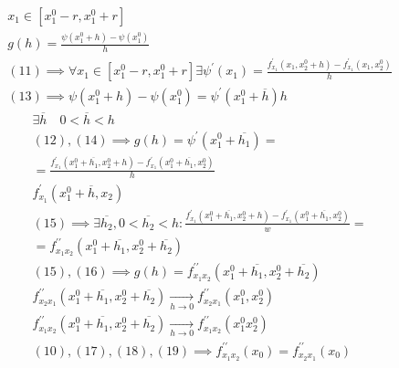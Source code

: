 \documentclass[main]{subfiles}
\begin{document}
\begin{longProof}
            \begin{gather*}
                x_1 \in [x_1^0-r,x_1^0+r] \\
                g(h) = \frac{\psi(x^0_1+h)-\psi(x_1^0)}{h} \tag{12}\\
                (11) \implies \forall x_1 \in [x_1^0-r,x_1^0+r] \exists \psi^\prime(x_1) =
                \frac{f^\prime_{x_1}(x_1,x_2^0+h)-f^\prime_{x_1}(x_1,x_2^0)}{h} \tag{13}\\
                (13) \implies \psi (x_1^0+h) - \psi(x_1^0) = \psi^\prime(x_1^0+\overline{h})h \tag{14}
            \end{gather*}
            \begin{gather*}
                \exists \overline{h} \quad 0 < \overline{h} < h \\
                (12),(14) \implies g(h) = \psi^\prime(x_1^0 + \overline{h_1}) = \\ =
                 \frac{f^\prime_{x_1}(x_1^0+\overline{h_1},x_2^0+h)-f^\prime_{x_1}(x_1^0+\overline{h_1},x_2^0)}{h} \tag{15}\\
                f^\prime_{x_1}(x_1^0 + \overline{h}, x_2) \\
                (15) \implies \exists \overline{h_2}, 0 < \overline{h_2} < h : 
                \frac{f^\prime_{x_1}(x_1^0 + \overline{h_1}, x_2^0 + h) - f^\prime_{x_1}(x_1^0 + \overline{h_1}, x_2^0)}{w} = \\
               = f^{\prime\prime}_{x_1 x_2}(x_1^0 + \overline{h_1}, x_2^0 + \overline{h_2}) \tag{16} \\
                (15),(16) \implies g(h) = f^{\prime\prime}_{x_1x_2}(x_1^0+ \overline{h_1}, x_2^0 + \overline{h_2}) \tag{17}\\
                f^{\prime\prime}_{x_2x_1}(x_1^0+ \overline{h_1}, x_2^0 + \overline{h_2}) \underset{h \to 0}{\rightarrow} f^{\prime\prime}_{x_2x_1}(x_1^0, x_2^0) \tag{18}\\
            f^{\prime\prime}_{x_1x_2}(x_1^0+ \overline{h_1}, x_2^0 + \overline{h_2}) \underset{h \to 0}{\rightarrow} f^{\prime\prime}_{x_1x_2}(x_1^0x_2^0) \tag{19}\\
            (10), (17), (18), (19) \implies f^{\prime\prime}_{x_1x_2}(x_0) = f^{\prime\prime}_{x_2x_1}(x_0)
            \end{gather*}
        \end{longProof}
\end{document}
